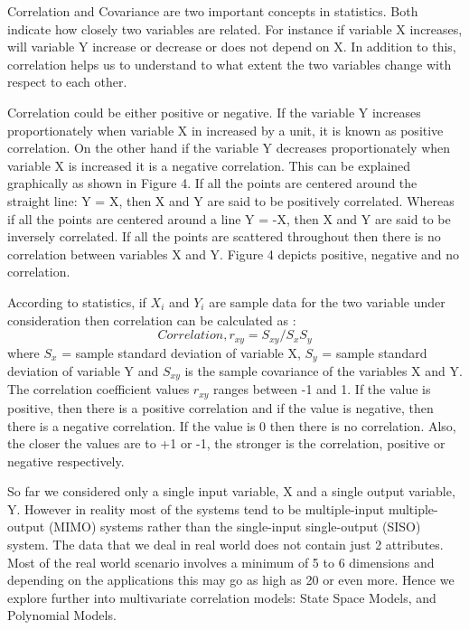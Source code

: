 \documentclass[article,type=msc,colorback,12pt,accentcolor=tud7b,table]{tudthesis}
\begin{document}
	Correlation and Covariance are two important concepts in statistics. Both indicate how closely two variables are related. For instance if variable X increases, will variable Y increase or decrease or does not depend on X. In addition to this, correlation helps us to understand to what extent the two variables change with respect to each other. 

\par
Correlation could be either positive or negative. If the variable Y increases proportionately when variable X in increased by a unit, it is known as positive correlation. On the other hand if the variable Y decreases proportionately when variable X is increased it is a negative correlation. This can be explained graphically as shown in Figure 4. If all the points are centered around the straight line: Y = X, then X and Y are said to be positively correlated. Whereas if all the points are centered around a line Y = -X, then X and Y are said to be inversely correlated. If all the points are scattered throughout then there is no correlation between variables X and Y. Figure 4 depicts positive, negative and no correlation.

\par
According to statistics, if $X_i$ and $Y_i$ are sample data for the two variable under consideration then correlation can be calculated as \cite{correlation}: $$ Correlation, r_{xy} = S_{xy} / S_x S_y $$ where $S_x$ = sample standard deviation of variable X, $S_y$ = sample standard deviation of variable Y and $S_{xy}$ is the sample covariance of the variables X and Y. The correlation coefficient values $r_{xy}$ ranges between -1 and 1. If the value is positive, then there is a positive correlation and if the value is negative, then there is a negative correlation. If the value is 0 then there is no correlation. Also, the closer the values are to +1 or -1, the stronger is the correlation, positive or negative respectively.
\par
So far we considered only a single input variable, X and a single output variable, Y. However in reality most of the systems tend to be multiple-input multiple-output (MIMO) systems rather than the single-input single-output (SISO) system. The data that we deal in real world does not contain just 2 attributes. Most of the real world scenario involves a minimum of 5 to 6 dimensions and depending on the applications this may go as high as 20 or even more. Hence we explore further into multivariate correlation models: State Space Models, and Polynomial Models.
\end{document}
